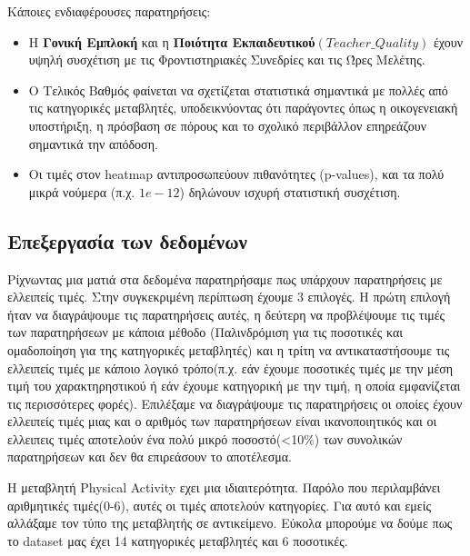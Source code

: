 \documentclass[12pt]{article}
\begin{document}
\noindent Κάποιες ενδιαφέρουσες παρατηρήσεις:

\begin{itemize}
    \item Η \textbf{Γονική Εμπλοκή } και η \textbf{Ποιότητα Εκπαιδευτικού$(Teacher\_Quality)$} έχουν υψηλή συσχέτιση με τις Φροντιστηριακές Συνεδρίες και τις Ώρες Μελέτης.
    \item Ο Τελικός Βαθμός φαίνεται να σχετίζεται στατιστικά σημαντικά με πολλές από τις κατηγορικές μεταβλητές, υποδεικνύοντας ότι παράγοντες όπως η οικογενειακή υποστήριξη, η πρόσβαση σε πόρους και το σχολικό περιβάλλον επηρεάζουν σημαντικά την απόδοση.
    \item Οι τιμές στον heatmap αντιπροσωπεύουν πιθανότητες (p-values), και τα πολύ μικρά νούμερα (π.χ. $1e-12$) δηλώνουν ισχυρή στατιστική συσχέτιση.
\end{itemize}

\subsection{Επεξεργασία των δεδομένων}
Ρίχνωντας μια ματιά στα δεδομένα παρατηρήσαμε πως υπάρχουν παρατηρήσεις με ελλειπείς τιμές. Στην συγκεκριμένη περίπτωση έχουμε 3 επιλογές. Η πρώτη επιλογή ήταν να διαγράψουμε τις παρατηρήσεις αυτές, η δεύτερη να προβλέψουμε τις τιμές των παρατηρήσεων με κάποια μέθοδο (Παλινδρόμιση για τις ποσοτικές και ομαδοποίηση για της κατηγορικές μεταβλητές) και η τρίτη να αντικαταστήσουμε τις ελλειπείς τιμές με κάποιο λογικό τρόπο(π.χ. εάν έχουμε ποσοτικές τιμές με την μέση τιμή του χαρακτηρηστικού ή εάν έχουμε κατηγορική με την τιμή, η οποία εμφανίζεται τις περισσότερες φορές). Επιλέξαμε να διαγράψουμε τις παρατηρήσεις οι οποίες έχουν ελλειπείς τιμές μιας και ο αριθμός των παρατηρήσεων είναι ικανοποιητικός και οι ελλειπεις τιμές αποτελούν ένα πολύ μικρό ποσοστό(<10\(\%\)) των συνολικών παρατηρήσεων και δεν θα επιρεάσουν το αποτέλεσμα. 

Η μεταβλητή Physical Activity εχει μια ιδιαιτερότητα. Παρόλο που περιλαμβάνει αριθμητικές τιμές(0-6), αυτές οι τιμές αποτελούν κατηγορίες. Για αυτό και εμείς αλλάξαμε τον τύπο της μεταβλητής σε αντικείμενο. Εύκολα μπορούμε να δούμε πως το dataset μας έχει 14 κατηγορικές μεταβλητές και 6 ποσοτικές.
\end{document}
